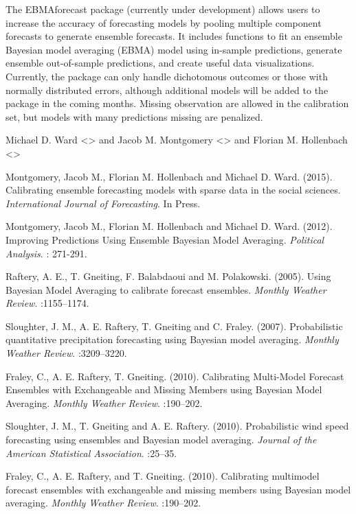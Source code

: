 \documentclass[a4paper]{book}
\begin{document}
%
\begin{Description}\relax
The EBMAforecast package (currently under development) allows users to increase the accuracy of forecasting models by pooling multiple component forecasts to generate ensemble forecasts. It includes functions to fit an ensemble Bayesian model averaging (EBMA) model using in-sample predictions, generate ensemble out-of-sample predictions, and create useful data visualizations.  Currently, the package can only handle dichotomous outcomes or those with normally distributed errors, although additional models will be added to the package in the coming months. Missing observation are allowed in the calibration set, but models with many predictions missing are penalized.
\end{Description}
%
\begin{Author}\relax
Michael D. Ward <> and Jacob M. Montgomery <> and Florian M. Hollenbach <>
\end{Author}
%
\begin{References}\relax
Montgomery, Jacob M., Florian M. Hollenbach and Michael D. Ward. (2015). Calibrating ensemble forecasting models with sparse data in the social sciences.   \emph{International Journal of Forecasting}. In Press.

Montgomery, Jacob M., Florian M. Hollenbach and Michael D. Ward. (2012). Improving Predictions Using Ensemble Bayesian Model Averaging.   \emph{Political Analysis}. : 271-291.

Raftery, A. E., T. Gneiting, F. Balabdaoui and M. Polakowski. (2005). Using Bayesian Model Averaging to calibrate forecast ensembles. \emph{Monthly Weather Review}. :1155--1174.

Sloughter, J. M., A. E. Raftery, T. Gneiting and C. Fraley. (2007). Probabilistic quantitative precipitation forecasting using Bayesian model averaging. \emph{Monthly Weather Review}. :3209--3220.

Fraley, C., A. E. Raftery, T. Gneiting. (2010). Calibrating Multi-Model Forecast Ensembles with Exchangeable and Missing Members using Bayesian Model Averaging. \emph{Monthly Weather Review}. :190--202.

Sloughter, J. M., T. Gneiting and A. E. Raftery. (2010). Probabilistic wind speed forecasting using ensembles and Bayesian model averaging. \emph{Journal of the American Statistical Association}. :25--35.

Fraley, C., A. E. Raftery, and T. Gneiting. (2010). Calibrating multimodel forecast ensembles with exchangeable and missing members using Bayesian model averaging. \emph{Monthly Weather Review}. :190--202.
\end{References}
\end{document}
